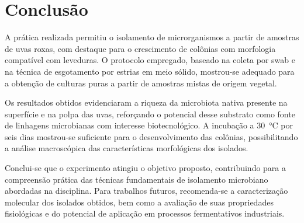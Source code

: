 
\section{Conclusão}

A prática realizada permitiu o isolamento de microrganismos a partir de amostras de uvas roxas, com destaque para o crescimento de colônias com morfologia compatível com leveduras. O protocolo empregado, baseado na coleta por swab e na técnica de esgotamento por estrias em meio sólido, mostrou-se adequado para a obtenção de culturas puras a partir de amostras mistas de origem vegetal.

Os resultados obtidos evidenciaram a riqueza da microbiota nativa presente na superfície e na polpa das uvas, reforçando o potencial desse substrato como fonte de linhagens microbianas com interesse biotecnológico. A incubação a 30~°C por seis dias mostrou-se suficiente para o desenvolvimento das colônias, possibilitando a análise macroscópica das características morfológicas dos isolados.

Conclui-se que o experimento atingiu o objetivo proposto, contribuindo para a compreensão prática das técnicas fundamentais de isolamento microbiano abordadas na disciplina. Para trabalhos futuros, recomenda-se a caracterização molecular dos isolados obtidos, bem como a avaliação de suas propriedades fisiológicas e do potencial de aplicação em processos fermentativos industriais.

